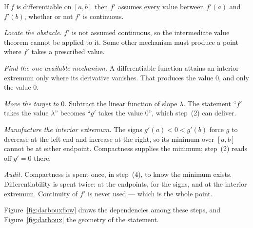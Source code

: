\begin{theorem}[Darboux]\label{thm:darboux}
If $f$ is differentiable on $[a,b]$ then $f'$ assumes every value between
$f'(a)$ and $f'(b)$, whether or not $f'$ is continuous.
\end{theorem}

\begin{flow}
  \item \textit{Locate the obstacle.} $f'$ is not assumed continuous, so the
        intermediate value theorem cannot be applied to it. Some other
        mechanism must produce a point where $f'$ takes a prescribed value.
  \item \textit{Find the one available mechanism.} A differentiable function
        attains an interior extremum only where its derivative vanishes. That
        produces the value $0$, and only the value $0$.
  \item \textit{Move the target to $0$.} Subtract the linear function of
        slope $\lambda$. The statement ``$f'$ takes the value $\lambda$''
        becomes ``$g'$ takes the value $0$'', which step~(2) can deliver.
  \item \textit{Manufacture the interior extremum.} The signs
        $g'(a)<0<g'(b)$ force $g$ to decrease at the left end and increase at
        the right, so its minimum over $[a,b]$ cannot be at either endpoint.
        Compactness supplies the minimum; step~(2) reads off $g'=0$ there.
  \item \textit{Audit.} Compactness is spent once, in step~(4), to know the
        minimum exists. Differentiability is spent twice: at the endpoints,
        for the signs, and at the interior extremum. Continuity of $f'$ is
        never used --- which is the whole point.
\end{flow}

Figure~\ref{fig:darbouxflow} draws the dependencies among these steps,
and Figure~\ref{fig:darboux} the geometry of the statement.

